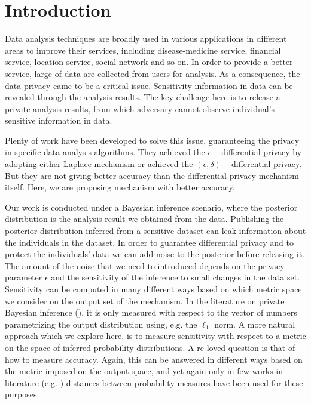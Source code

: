 \documentclass{article}
\begin{document}
\section{Introduction}
\label{sec_intro}
Data analysis techniques are broadly used in various applications in different areas to improve their services, including disease-medicine service, financial service, location service, social network and so on. In order to provide a better service, large of data are collected from users for analysis. As a consequence, the data privacy came to be a critical issue. Sensitivity information in data can be revealed through the analysis results. The key challenge here is to release a private analysis results, from which adversary cannot observe individual's sensitive information in data.

Plenty of work have been developed to solve this issue, guaranteeing the privacy in specific data analysis algorithms. They achieved the $\epsilon-$differential privacy by adopting either Laplace mechanism or achieved the $(\epsilon, \delta)-$differential privacy. But they are not giving better accuracy than the differential privacy mechanism itself. Here, we are proposing mechanism with better accuracy.

Our work is conducted under a Bayesian inference scenario, where the posterior distribution is the analysis result we obtained from the data.
Publishing the posterior distribution inferred from a sensitive dataset can
leak information about the individuals in the dataset.
In order to guarantee differential privacy and to protect the
individuals' data we can add noise to the posterior before releasing it.
The amount of the noise that we need to introduced
depends on the privacy parameter $\epsilon$ and the sensitivity of the inference to
small changes in the data set. 
Sensitivity can be computed in many different ways based on which metric space
we consider on the output set of the mechanism. In the literature on private Bayesian
inference (\cite{zhang2016differential,xiao2012bayesian}), it is only measured with
respect to the vector of numbers parametrizing the output distribution using, e.g. the $\ell_1$ norm.
A more natural approach which we explore here, is to measure sensitivity with respect to a metric on the space of inferred probability distributions.
A re-loved question is that of how to measure accuracy. Again,
this can be answered in different ways based on the metric imposed on the output space, and yet again
only in few works in literature (e.g. \cite{zhang2016differential})
distances between probability measures have been used for these purposes.
\end{document}
